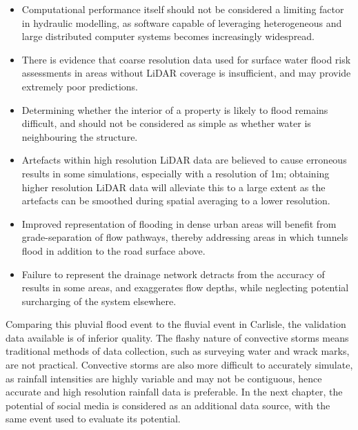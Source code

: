 \begin{itemize}
	\item Computational performance itself should not be considered a limiting factor in hydraulic modelling, as software capable of leveraging heterogeneous and large distributed computer systems becomes increasingly widespread. 
	\item There is evidence that coarse resolution data used for surface water flood risk assessments in areas without LiDAR coverage is insufficient, and may provide extremely poor predictions.
	\item Determining whether the interior of a property is likely to flood remains difficult, and should not be considered as simple as whether water is neighbouring the structure.
	\item Artefacts within high resolution LiDAR data are believed to cause erroneous results in some simulations, especially with a resolution of 1m; obtaining higher resolution LiDAR data will alleviate this to a large extent as the artefacts can be smoothed during spatial averaging to a lower resolution.
	\item Improved representation of flooding in dense urban areas will benefit from grade-separation of flow pathways, thereby addressing areas in which tunnels flood in addition to the road surface above.
	\item Failure to represent the drainage network detracts from the accuracy of results in some areas, and exaggerates flow depths, while neglecting potential surcharging of the system elsewhere.
\end{itemize}

Comparing this pluvial flood event to the fluvial event in Carlisle, the validation data available is of inferior quality. The flashy nature of convective storms means traditional methods of data collection, such as surveying water and wrack marks, are not practical. Convective storms are also more difficult to accurately simulate, as rainfall intensities are highly variable and may not be contiguous, hence accurate and high resolution rainfall data is preferable. In the next chapter, the potential of social media is considered as an additional data source, with the same event used to evaluate its potential.